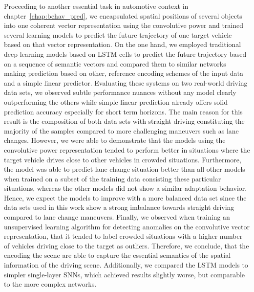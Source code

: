 Proceeding to another essential task in automotive context in chapter~\ref{chap:behav_pred}, we encapsulated spatial positions of several objects into one coherent vector representation using the convolutive power and trained several learning models to predict the future trajectory of one target vehicle based on that vector representation.
On the one hand, we employed traditional deep learning models based on \ac{LSTM} cells to predict the future trajectory based on a sequence of semantic vectors and compared them to similar networks making prediction based on other, reference encoding schemes of the input data and a simple linear predictor.
Evaluating these systems on two real-world driving data sets, we observed subtle performance nuances without any model clearly outperforming the others while simple linear prediction already offers solid prediction accuracy especially for short term horizons.
The main reason for this result is the composition of both data sets with straight driving constituting the majority of the samples compared to more challenging maneuvers such as lane changes.
However, we were able to demonstrate that the models using the convolutive power representation tended to perform better in situations where the target vehicle drives close to other vehicles in crowded situations.
Furthermore, the model was able to predict lane change situation better than all other models when trained on a subset of the training data consisting these particular situations, whereas the other models did not show a similar adaptation behavior.
Hence, we expect the models to improve with a more balanced data set since the data sets used in this work show a strong imbalance towards straight driving compared to lane change maneuvers.
Finally, we observed when training an unsupervised learning algorithm for detecting anomalies on the convolutive vector representation, that it tended to label crowded situations with a higher number of vehicles driving close to the target as outliers.
Therefore, we conclude, that the encoding the scene are able to capture the essential semantics of the spatial information of the driving scene.
Additionally, we compared the \ac{LSTM} models to simpler single-layer \acp{SNN}, which achieved results slightly worse, but comparable to the more complex networks.

